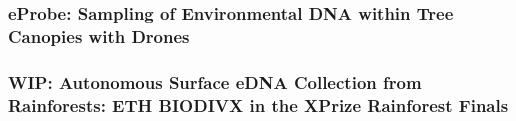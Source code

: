 \subsubsection{eProbe: Sampling of Environmental DNA within Tree Canopies with Drones \cite{Kirchgeorg2024}}

\subsubsection{WIP: Autonomous Surface eDNA Collection from Rainforests: ETH BIODIVX in the XPrize Rainforest Finals}






